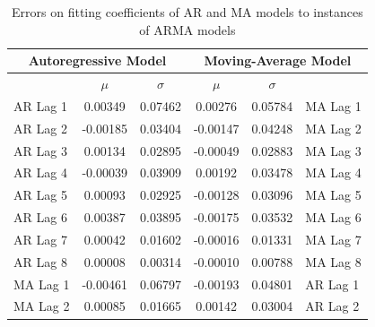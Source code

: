 \documentclass[oneside,12pt,openany]{book}
\begin{document}
	
	\begin{table}[!ht]
		\centering
		\begin{tabular}{|l|c|c|c|c|l|}
			\hline
			\multicolumn{3}{|c|}{\textbf{Autoregressive Model}}   & \multicolumn{3}{c|}{\textbf{Moving-Average Model}}     \\ \hline
			\cellcolor{black} & $\mu$ & $\sigma$ & $\mu$ & $\sigma$ & \cellcolor{black}         \\ \hline
			AR Lag 1 & 0.00349                  & 0.07462                    & 0.00276                  & 0.05784                    & MA Lag 1 \\ \hline
			AR Lag 2 & -0.00185                 & 0.03404                    & -0.00147                 & 0.04248                    & MA Lag 2 \\ \hline
			AR Lag 3 & 0.00134                  & 0.02895                    & -0.00049                 & 0.02883                    & MA Lag 3 \\ \hline
			AR Lag 4 & -0.00039                 & 0.03909                    & 0.00192                  & 0.03478                    & MA Lag 4 \\ \hline
			AR Lag 5 & 0.00093                  & 0.02925                    & -0.00128                 & 0.03096                    & MA Lag 5 \\ \hline
			AR Lag 6 & 0.00387                  & 0.03895                    & -0.00175                 & 0.03532                    & MA Lag 6 \\ \hline
			AR Lag 7 & 0.00042                  & 0.01602                    & -0.00016                 & 0.01331                    & MA Lag 7 \\ \hline
			AR Lag 8 & 0.00008                   & 0.00314                    & -0.00010                  & 0.00788                    & MA Lag 8 \\ \hline
			MA Lag 1 & -0.00461                 & 0.06797                    & -0.00193                 & 0.04801                    & AR Lag 1 \\ \hline
			MA Lag 2 & 0.00085                  & 0.01665                    & 0.00142                  & 0.03004                    & AR Lag 2 \\ \hline
		\end{tabular}
		\caption{Errors on fitting coefficients of AR and MA models to instances of ARMA models}
	\end{table}
\end{document}
